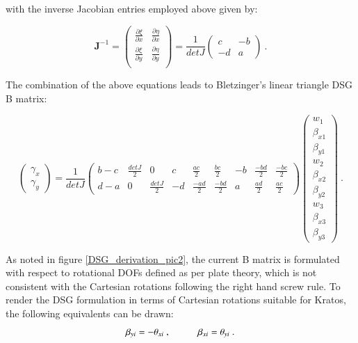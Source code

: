 with the inverse Jacobian entries employed above given by:

\begin{equation} 
\mathbf{J}^{-1} = 
\begin{pmatrix}
\frac{\partial \xi}{\partial x} & \frac{\partial \eta}{\partial x} \\
\frac{\partial \xi}{\partial y} & \frac{\partial \eta}{\partial y} \\
\end{pmatrix}
=
\frac{1}{detJ}
\begin{pmatrix}
c & -b \\
-d & a
\end{pmatrix}
\label{DSG_derivation_14}\ .
\end{equation}

The combination of the above equations leads to Bletzinger's \cite{Ble00} linear triangle DSG B matrix:

\begin{equation} 
\begin{pmatrix}
\gamma_x \\
\gamma_y 
\end{pmatrix}
=
\frac{1}{detJ}
\begin{pmatrix}
b-c & \frac{detJ}{2} & 0 & c & \frac{ac}{2} & \frac{bc}{2} & -b & \frac{-bd}{2} & \frac{-bc}{2} \\
d-a & 0 & \frac{detJ}{2} & -d & \frac{-ad}{2} & \frac{-bd}{2} & a & \frac{ad}{2} & \frac{ac}{2}
\end{pmatrix}
\begin{pmatrix}
w_1 \\
\beta_{x1} \\
\beta_{y1} \\
w_2 \\
\beta_{x2} \\
\beta_{y2} \\
w_3 \\
\beta_{x3} \\
\beta_{y3} 
\end{pmatrix}
\label{DSG_derivation_15}\ .
\end{equation}

As noted in figure \ref{DSG_derivation_pic2}, the current B matrix is formulated with respect to rotational DOFs defined as per plate theory, which is not consistent with the Cartesian rotations following the right hand screw rule. To render the DSG formulation in terms of Cartesian rotations suitable for Kratos, the following equivalents can be drawn:
\begin{equation} 
\beta_{yi} = -\theta_{xi}\ ,
\hspace{10mm}
\beta_{xi} = \theta_{yi}
\label{DSG_derivation_16}\ .
\end{equation}

